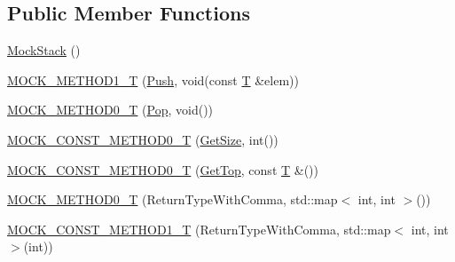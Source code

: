 \subsection*{Public Member Functions}
\begin{DoxyCompactItemize}
\item 
\hyperlink{classtesting_1_1gmock__generated__function__mockers__test_1_1_mock_stack_aa8a3df8e1cbc95836663acd99c3e9d37}{Mock\+Stack} ()
\item 
\hyperlink{classtesting_1_1gmock__generated__function__mockers__test_1_1_mock_stack_a0ad833bc6134c5150b8271a5ba2e91b5}{M\+O\+C\+K\+\_\+\+M\+E\+T\+H\+O\+D1\+\_\+T} (\hyperlink{classtesting_1_1gmock__generated__function__mockers__test_1_1_stack_interface_a49448f6195021fee947d37b80b6e5d30}{Push}, void(const \hyperlink{functions__7_8js_adf1f3edb9115acb0a1e04209b7a9937b}{T} \&elem))
\item 
\hyperlink{classtesting_1_1gmock__generated__function__mockers__test_1_1_mock_stack_a5e55ffb22e7f11c6940a97bd001bd50c}{M\+O\+C\+K\+\_\+\+M\+E\+T\+H\+O\+D0\+\_\+T} (\hyperlink{classtesting_1_1gmock__generated__function__mockers__test_1_1_stack_interface_a1a6646d1d9febe90c607b9b3e4539b67}{Pop}, void())
\item 
\hyperlink{classtesting_1_1gmock__generated__function__mockers__test_1_1_mock_stack_a6171be20e8e4f44464cc8968e05b7c7a}{M\+O\+C\+K\+\_\+\+C\+O\+N\+S\+T\+\_\+\+M\+E\+T\+H\+O\+D0\+\_\+T} (\hyperlink{classtesting_1_1gmock__generated__function__mockers__test_1_1_stack_interface_a537ec8647a2333f50e5f923a85b90eba}{Get\+Size}, int())
\item 
\hyperlink{classtesting_1_1gmock__generated__function__mockers__test_1_1_mock_stack_ae5950cfac08382a0ffc7c3bd5aba405f}{M\+O\+C\+K\+\_\+\+C\+O\+N\+S\+T\+\_\+\+M\+E\+T\+H\+O\+D0\+\_\+T} (\hyperlink{classtesting_1_1gmock__generated__function__mockers__test_1_1_stack_interface_af36e32b9ae568100363466d1ebf95364}{Get\+Top}, const \hyperlink{functions__7_8js_adf1f3edb9115acb0a1e04209b7a9937b}{T} \&())
\item 
\hyperlink{classtesting_1_1gmock__generated__function__mockers__test_1_1_mock_stack_a4b67d1f5b795e7c072fb846217a8f130}{M\+O\+C\+K\+\_\+\+M\+E\+T\+H\+O\+D0\+\_\+T} (Return\+Type\+With\+Comma, std\+::map$<$ int, int $>$())
\item 
\hyperlink{classtesting_1_1gmock__generated__function__mockers__test_1_1_mock_stack_a69b9a7d0231b729d8a47201a49fa9166}{M\+O\+C\+K\+\_\+\+C\+O\+N\+S\+T\+\_\+\+M\+E\+T\+H\+O\+D1\+\_\+T} (Return\+Type\+With\+Comma, std\+::map$<$ int, int $>$(int))
\end{DoxyCompactItemize}


